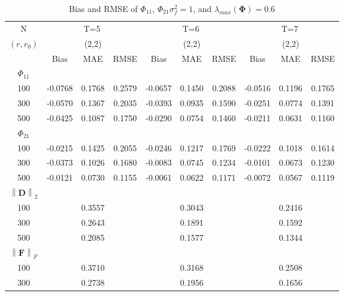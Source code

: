 \documentclass[12pt,a4paper,hyperref]{article}
\begin{document}
\begin{table}[H]
\caption{Bias and RMSE of $\Phi_{11}$, $\Phi_{21}$$\sigma^{2}_{f}=1$,  and $\lambda_{max}(\boldsymbol{\Phi})=0.6$}
\centering
\tabcolsep=0.11cm
\begin{threeparttable}
\begin{tabular} {*{10}{c}}
\toprule
N& \multicolumn{3}{c}{T=5}&\multicolumn{3}{c}{T=6}&\multicolumn{3}{c}{T=7}\\
\cmidrule(lr){1-10}
$(r,r_{0})$ &   &(2,2)  &  &   &(2,2)  & &  &(2,2) & \\
\cmidrule(lr){1-4} \cmidrule(lr){5-7}\cmidrule(lr){8-10}
& \multicolumn{1}{c}{Bias} &\multicolumn{1}{c}{MAE}& \multicolumn{1}{c}{RMSE}&\multicolumn{1}{c}{Bias} &\multicolumn{1}{c}{MAE}& \multicolumn{1}{c}{RMSE}&\multicolumn{1}{c}{Bias}&\multicolumn{1}{c}{MAE} & \multicolumn{1}{c}{RMSE}\\
  \cmidrule(lr){2-4} \cmidrule(lr){5-7} \cmidrule(lr){8-10}
 $\Phi_{11}$\\
\cmidrule(lr){1-10}
 100&-0.0768 & 0.1768&0.2579 & -0.0657 &0.1450 &0.2088 & -0.0516&0.1196 & 0.1765\\
300&-0.0570 & 0.1367& 0.2035& -0.0393 &0.0935 & 0.1590& -0.0251& 0.0774&0.1391\\
500&-0.0425 & 0.1087& 0.1750&  -0.0290& 0.0754& 0.1460& -0.0211&0.0631 & 0.1160\\
\cmidrule(lr){1-10}
$\Phi_{21}$\\
\cmidrule(lr){1-4}   \cmidrule(lr){5-7}   \cmidrule(lr){8-10}
100&-0.0215 &0.1425 & 0.2055& -0.0246 &0.1217 &0.1769 &-0.0222 & 0.1018&0.1614 \\
300& -0.0373&0.1026& 0.1680&-0.0083 & 0.0745&0.1234 &-0.0101& 0.0673&0.1230\\
500& -0.0121&0.0730 &0.1155 & -0.0061 & 0.0622&0.1171 &-0.0072 &0.0567 & 0.1119\\
\cmidrule(lr){1-10}
$\left\| \boldsymbol{D} \right\|_{2} $\\
\cmidrule(lr){1-4}   \cmidrule(lr){5-7}   \cmidrule(lr){8-10}
100& &0.3557 & &  &0.3043& & &0.2416& \\
300& &0.2643 & &  & 0.1891& & & 0.1592&\\
500& & 0.2085& &  &0.1577& & &0.1344 & \\
\cmidrule(lr){1-10}
$\left\| \boldsymbol{F} \right\|_{F} $\\
\cmidrule(lr){1-4}   \cmidrule(lr){5-7}   \cmidrule(lr){8-10}
100& &0.3710 & &  &0.3168 & & &0.2508 & \\
300& & 0.2738& &  &0.1956 & & &0.1656&\\

\end{tabular}
\end{threeparttable}
\end{table}
\end{document}
